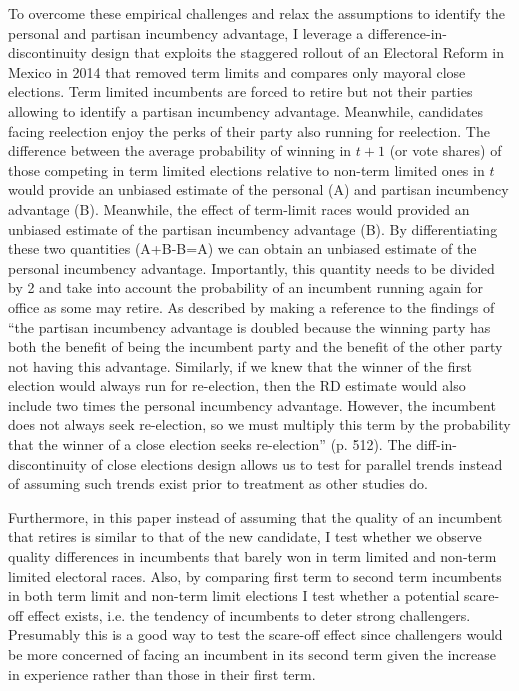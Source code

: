 \documentclass[12pt]{amsart}
\numberwithin{equation}{section}
\theoremstyle{definition}
\theoremstyle{definition}
\theoremstyle{definition}
\begin{document}
To overcome these empirical challenges and relax the  assumptions to identify the personal and partisan incumbency advantage, I leverage a difference-in-discontinuity design that exploits the staggered rollout of an Electoral Reform in Mexico in 2014 that removed term limits and compares only mayoral close elections. Term limited incumbents are forced to retire but not their parties allowing to identify a partisan incumbency advantage. Meanwhile, candidates facing reelection enjoy the perks of their party also running for reelection. The difference between the average probability of winning in $t+1$ (or vote shares) of those competing in term limited elections relative to non-term limited ones in $t$ would provide an unbiased estimate of the personal (A) and partisan incumbency advantage (B). Meanwhile, the effect of term-limit races would provided an unbiased estimate of the partisan incumbency advantage (B). By differentiating these two quantities (A+B-B=A) we can obtain an unbiased estimate of the personal incumbency advantage. Importantly, this quantity needs to be divided by 2 and take into account the probability of an incumbent running again for office as some may retire. As described by \citet{fowler_hall_2014} making a reference to the findings of \citet{erikson_titiunik_2015} ``the partisan incumbency advantage is doubled because the winning party has both the benefit of being the incumbent party and the benefit of the other party not having this advantage. Similarly, if we knew that the winner of the first election would always run for re-election, then the RD estimate would also include two times the personal incumbency advantage. However, the incumbent does not always seek re-election, so we must multiply this term by the probability that the winner of a close election seeks re-election'' (p. 512). The diff-in-discontinuity of close elections design allows us to test for parallel trends instead of assuming such trends exist prior to treatment as other studies do.

Furthermore, in this paper instead of assuming that the quality of an incumbent that retires is similar to that of the new candidate, I test whether we observe quality differences in incumbents that barely won in term limited and non-term limited electoral races. Also, by comparing first term to second term incumbents in both term limit and non-term limit elections I test whether a potential scare-off effect exists, i.e. the tendency of incumbents to deter strong challengers. Presumably this is a good way to test the scare-off effect since challengers would be more concerned of facing an incumbent in its second term given the increase in experience rather than those in their first term. 
\end{document}

